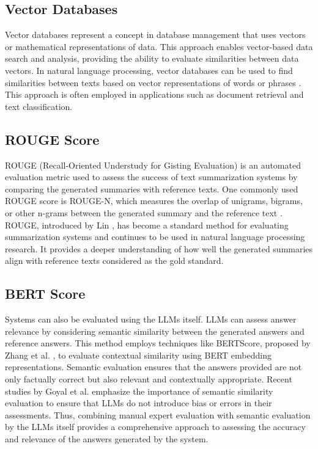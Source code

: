 \documentclass[runningheads]{llncs}
\begin{document}
\subsection{Vector Databases}
Vector databases represent a concept in database management that uses vectors or mathematical representations of data. This approach enables vector-based data search and analysis, providing the ability to evaluate similarities between data vectors. In natural language processing, vector databases can be used to find similarities between texts based on vector representations of words or phrases \cite{Manning2008}. This approach is often employed in applications such as document retrieval and text classification.

\subsection{ROUGE Score}
ROUGE (Recall-Oriented Understudy for Gisting Evaluation) is an automated evaluation metric used to assess the success of text summarization systems by comparing the generated summaries with reference texts. One commonly used ROUGE score is ROUGE-N, which measures the overlap of unigrams, bigrams, or other n-grams between the generated summary and the reference text \cite{Lin2004}. ROUGE, introduced by Lin \cite{Lin2004}, has become a standard method for evaluating summarization systems and continues to be used in natural language processing research. It provides a deeper understanding of how well the generated summaries align with reference texts considered as the gold standard.

\subsection{BERT Score}
Systems can also be evaluated using the LLMs itself. LLMs can assess answer relevance by considering semantic similarity between the generated answers and reference answers. This method employs techniques like BERTScore, proposed by Zhang et al. \cite{Zhang2020}, to evaluate contextual similarity using BERT embedding representations. Semantic evaluation ensures that the answers provided are not only factually correct but also relevant and contextually appropriate. Recent studies by Goyal et al. \cite{Goyal2020} emphasize the importance of semantic similarity evaluation to ensure that LLMs do not introduce bias or errors in their assessments. Thus, combining manual expert evaluation with semantic evaluation by the LLMs itself provides a comprehensive approach to assessing the accuracy and relevance of the answers generated by the system.
\end{document}
